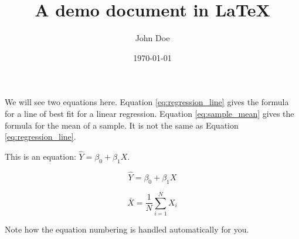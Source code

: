 \documentclass{article}
\title{A demo document in \LaTeX{}}
\author{John Doe}
\date{\today}
\begin{document}
\maketitle

We will see two equations here. Equation \ref{eq:regression_line}
gives the formula for a line of best fit for a linear
regression. Equation \ref{eq:sample_mean} gives the formula for the
mean of a sample. It is not the same as Equation
\ref{eq:regression_line}.

This is an equation: $\hat{Y} = \beta_{0} + \beta_{1} X$.

\begin{equation}
  \hat{Y} = \beta_{0} + \beta_{1} X
\label{eq:regression_line}
\end{equation}

\begin{equation}
  \bar{X} = \frac{1}{N} \sum_{i=1}^{N} X_{i}
\label{eq:sample_mean}
\end{equation}

Note how the equation numbering is handled automatically for you.
\end{document}
